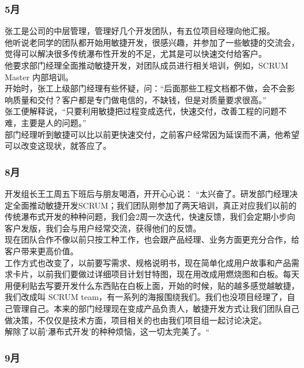 \documentclass{book}        %
\begin{document}
\hypertarget{ux6708}{%
\subsubsection{5月}\label{ux6708}}

张工是公司的中层管理，管理好几个开发团队，有五位项目经理向他汇报。\\
他听说老同学的团队都开始用敏捷开发，很感兴趣，并参加了一些敏捷的交流会，觉得可以解决很多传统瀑布性开发的不足，尤其是可以快速交付给客户。\\
他要求部门经理全面推动敏捷开发，对团队成员进行相关培训，例如，SCRUM
Master 内部培训。\\
开始时，张工上级部门经理有些怀疑，问：``后面那些工程文档都不做，会不会影响质量和交付？客户都是专门做电信的，不缺钱，但是对质量要求很高。''\\
张工便解释说，``只要利用敏捷把过程变成迭代，快速交付，改善工程的问题不难，主要是人的问题。''\\
部门经理听到敏捷可以比以前更快速交付，之前客户经常因为延误而不满，他希望可以改变这现状，就答应了。

\hypertarget{ux6708-1}{%
\subsubsection{8月}\label{ux6708-1}}

开发组长王工周五下班后与朋友喝酒，开开心心说：
``太兴奋了。研发部门经理决定全面推动敏捷开发SCRUM；我们团队刚参加了两天培训，真正对应我们以前的传统瀑布式开发的种种问题，我们会2周一次迭代，快速反馈，我们会定期小步向客户发版，我们会与用户经常交流，获得他们的反馈。\\
现在团队合作不像以前只按工种工作，也会跟产品经理、业务方面更充分合作，给客户带来更高价值。\\
工作方式也改变了，以前要写需求、规格说明书，现在简单化成用户故事和产品需求卡片，以前我们要做过详细项目计划甘特图，现在用改成用燃烧图和白板。每天用便利贴去写要开发什么东西贴在白板上面，开始的时候，贴的越多感觉越敏捷，我们改成叫
SCRUM
team，有一系列的海报围绕我们。我们也没项目经理了，自己管理自己。本来的部门经理现在变成产品负责人，敏捷开发方式让我们团队自己做决策，不仅仅是技术方面，项目相关的也由我们项目组一起讨论决定。\\
解除了以前`瀑布式开发'的种种烦恼，这一切太完美了。``\\

\hypertarget{ux6708-2}{%
\subsubsection{9月}\label{ux6708-2}}
\end{document}
